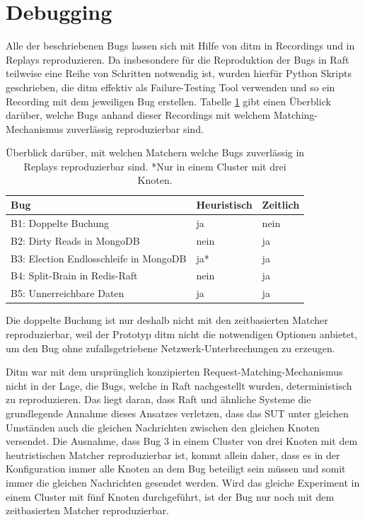 \documentclass[12pt,a4paper]{report}
\begin{document}
\section{Debugging}
Alle der beschriebenen Bugs lassen sich mit Hilfe von ditm in Recordings und in Replays reproduzieren. Da insbesondere für die
Reproduktion der Bugs in Raft teilweise eine Reihe von Schritten notwendig ist, wurden hierfür Python Skripts geschrieben, die
ditm effektiv als Failure-Testing Tool verwenden und so ein Recording mit dem jeweiligen Bug erstellen. Tabelle \ref{tab:debug}
gibt einen Überblick darüber, welche Bugs anhand dieser Recordings mit welchem Matching-Mechanismus zuverlässig reproduzierbar
sind.

\begin{table}[H]
	\centering
	\caption{Überblick darüber, mit welchen Matchern welche Bugs zuverlässig in Replays reproduzierbar sind. *Nur in einem Cluster mit
		drei Knoten.}
	\label{tab:debug}
	\begin{tabular}{|l|l|l|}
		\hline
		Bug                                    & Heuristisch & Zeitlich \\ \hline
		B1: Doppelte Buchung                   & ja          & nein     \\ \hline
		B2: Dirty Reads in MongoDB             & nein        & ja       \\ \hline
		B3: Election Endlosschleife in MongoDB & ja*         & ja       \\ \hline
		B4: Split-Brain in Redis-Raft          & nein        & ja       \\ \hline
		B5: Unnerreichbare Daten               & ja          & ja       \\ \hline
	\end{tabular}
\end{table}

Die doppelte Buchung ist nur deshalb nicht mit den zeitbasierten Matcher reproduzierbar, weil der Prototyp ditm nicht die
notwendigen Optionen anbietet, um den Bug ohne zufallsgetriebene Netzwerk-Unterbrechungen zu erzeugen.

Ditm war mit dem ursprünglich konzipierten Request-Matching-Mechanismus nicht in der Lage, die Bugs, welche in Raft nachgestellt
wurden, deterministisch zu reproduzieren. Das liegt daran, dass Raft und ähnliche Systeme die grundlegende Annahme dieses Ansatzes
verletzen, dass das SUT unter gleichen Umständen auch die gleichen Nachrichten zwischen den gleichen Knoten versendet. Die
Ausnahme, dass Bug 3 in einem Cluster von drei Knoten mit dem heutristischen Matcher reproduzierbar ist, kommt allein daher, dass
es in der Konfiguration immer alle Knoten an dem Bug beteiligt sein müssen und somit immer die gleichen Nachrichten gesendet
werden.  Wird das gleiche Experiment in einem Cluster mit fünf Knoten durchgeführt, ist der Bug nur noch mit dem zeitbasierten
Matcher reproduzierbar.
\end{document}
